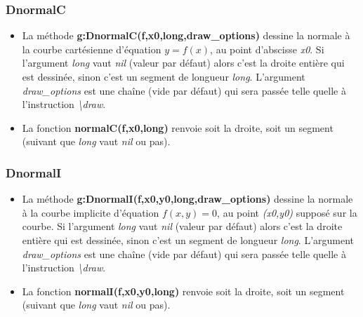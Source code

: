 \subsubsection{ DnormalC}
\begin{itemize}
    \item La méthode \textbf{g:DnormalC(f,x0,long,draw\_options)} dessine la normale à la courbe cartésienne d'équation \(y=f(x)\), au point d'abscisse \emph{x0}. Si l'argument \emph{long} vaut \emph{nil} (valeur par défaut) alors c'est la droite entière qui est dessinée, sinon c'est un segment de longueur \emph{long}. L'argument \emph{draw\_options} est une chaîne (vide par défaut) qui sera passée telle quelle à l'instruction \emph{\textbackslash draw}.
    \item La fonction \textbf{normalC(f,x0,long)} renvoie soit la droite, soit un segment (suivant que \emph{long} vaut \emph{nil} ou pas).
\end{itemize}

\subsubsection{DnormalI}
\begin{itemize}
    \item La méthode \textbf{g:DnormalI(f,x0,y0,long,draw\_options)} dessine la normale à la courbe implicite d'équation \(f(x,y)=0\), au point \emph{(x0,y0)} supposé sur la courbe. Si l'argument \emph{long} vaut \emph{nil} (valeur par défaut) alors c'est la droite entière qui est dessinée, sinon c'est un segment de longueur \emph{long}. L'argument \emph{draw\_options} est une chaîne (vide par défaut) qui sera passée telle quelle à l'instruction \emph{\textbackslash draw}.
    \item La fonction \textbf{normalI(f,x0,y0,long)} renvoie soit la droite, soit un segment (suivant que \emph{long} vaut \emph{nil} ou pas).
\end{itemize}
  

